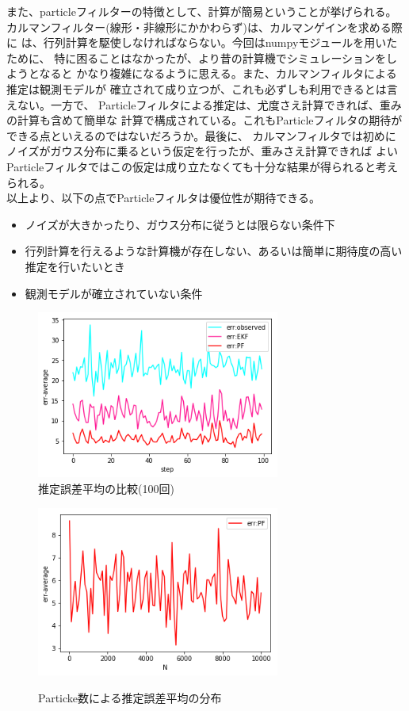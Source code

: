 また、particleフィルターの特徴として、計算が簡易ということが挙げられる。
カルマンフィルター(線形・非線形にかかわらず)は、カルマンゲインを求める際に
は、行列計算を駆使しなければならない。今回はnumpyモジュールを用いたために、
特に困ることはなかったが、より昔の計算機でシミュレーションをしようとなると
かなり複雑になるように思える。また、カルマンフィルタによる推定は観測モデルが
確立されて成り立つが、これも必ずしも利用できるとは言えない。一方で、
Particleフィルタによる推定は、尤度さえ計算できれば、重みの計算も含めて簡単な
計算で構成されている。これもParticleフィルタの期待ができる点といえるのではないだろうか。最後に、
カルマンフィルタでは初めにノイズがガウス分布に乗るという仮定を行ったが、重みさえ計算できれば
よいParticleフィルタではこの仮定は成り立たなくても十分な結果が得られると考えられる。\\
以上より、以下の点でParticleフィルタは優位性が期待できる。
\begin{itemize}
  \item ノイズが大きかったり、ガウス分布に従うとは限らない条件下
  \item 行列計算を行えるような計算機が存在しない、あるいは簡単に期待度の高い
  推定を行いたいとき
  \item 観測モデルが確立されていない条件
\end{itemize}
\begin{figure}[htbp]
  \begin{center}
    \includegraphics[width=80mm]{report8-3/PF_1/err比較.png}
  \end{center}
  \caption{推定誤差平均の比較(100回)}
\end{figure}
\begin{figure}[htbp]
  \begin{center}
    \includegraphics[width=80mm]{report8-3/PF_2/err_trans.png}
    \label{pic:8-2-2-1}
  \end{center}
  \caption{Particke数による推定誤差平均の分布}
\end{figure}

